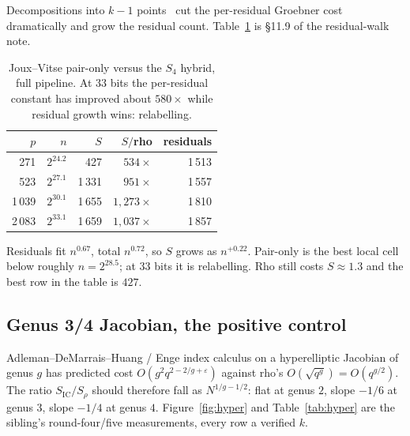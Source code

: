 Decompositions into $k-1$ points~\cite{jouxvitse2013} cut the
per-residual Groebner cost dramatically and grow the residual count.
Table~\ref{tab:paironly} is §11.9 of the residual-walk
note.

\begin{table}[t]
\centering
\small
\caption{Joux--Vitse pair-only versus the $S_4$ hybrid, full
  pipeline. At $33$ bits the per-residual constant has improved about
  $580\times$ while residual growth wins: relabelling.}
\label{tab:paironly}
\begin{tabular}{@{}rrrrr@{}}
\toprule
$p$ & $n$ & $S$ & $S/$rho & residuals \\
\midrule
271 & $2^{24.2}$ & 427 & $534\times$ & 1\,513 \\
523 & $2^{27.1}$ & 1\,331 & $951\times$ & 1\,557 \\
1\,039 & $2^{30.1}$ & 1\,655 & $1{,}273\times$ & 1\,810 \\
2\,083 & $2^{33.1}$ & 1\,659 & $1{,}037\times$ & 1\,857 \\
\bottomrule
\end{tabular}
\end{table}

Residuals fit $n^{0.67}$, total $n^{0.72}$, so $S$ grows as
$n^{+0.22}$. Pair-only is the best local cell below roughly
$n=2^{28.5}$; at $33$ bits it is relabelling. Rho still costs
$S\approx 1.3$ and the best row in the table is $427$.

\subsection{Genus 3/4 Jacobian, the positive control}
\label{sec:ic-hyper}

Adleman--DeMarrais--Huang / Enge index calculus on a hyperelliptic
Jacobian of genus $g$ has predicted cost $O(g^2 q^{2-2/g+\varepsilon})$
against rho's $O(\sqrt{q^g})=O(q^{g/2})$. The ratio
$S_{\mathrm{IC}}/S_{\rho}$ should therefore fall as $N^{1/g-1/2}$:
flat at genus $2$, slope $-1/6$ at genus $3$, slope $-1/4$ at genus
$4$. Figure~\ref{fig:hyper} and Table~\ref{tab:hyper} are the sibling's
round-four/five measurements, every row a verified
$k$.

